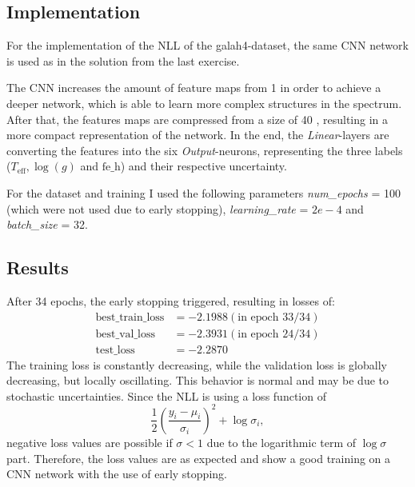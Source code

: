 

\setlength{\parindent}{0em}



\subsection{Implementation}
For the implementation of the NLL of the galah4-dataset, the same CNN network is used as in the solution from the last exercise.

The CNN increases the amount of feature maps from 1    in order to achieve a deeper network, which is able to learn more complex structures in the spectrum.
After that, the features maps are compressed from a size of 40   , resulting in a more compact representation of the network.
In the end, the \textit{Linear}-layers are converting the features into the six \textit{Output}-neurons, representing the three labels ($T_\text{eff}, \log(g)$ and $\text{fe\_h}$) and their respective uncertainty.

For the dataset and training I used the following parameters \textit{num\_epochs} = 100 (which were not used due to early stopping), \textit{learning\_rate} = $2e-4$ and \textit{batch\_size} = 32.

\subsection{Results}
After 34 epochs, the early stopping triggered, resulting in losses of:
\begin{align*}
  \text{best\_train\_loss} &= -2.1988 (\text{in epoch 33/34})\\
  \text{best\_val\_loss} &= -2.3931 (\text{in epoch 24/34})\\
  \text{test\_loss} &= -2.2870
\end{align*}
The training loss is constantly decreasing, while the validation loss is globally decreasing, but locally oscillating. This behavior is normal and may be due to stochastic uncertainties.
Since the NLL is using a loss function of
\begin{equation}
  \nonumber
  \frac{1}{2} \left(\frac{y_i - \mu_i}{\sigma_i}\right)^2 + \log{\sigma_i},
\end{equation}
negative loss values are possible if $\sigma < 1$ due to the logarithmic term of $\log{\sigma}$ part.
Therefore, the loss values are as expected and show a good training on a CNN network with the use of early stopping.

